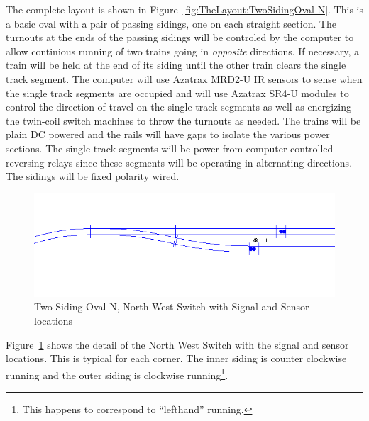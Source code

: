 The complete layout is shown in
Figure~\ref{fig:TheLayout:TwoSidingOval-N}. This is a basic oval with a
pair of passing sidings, one on each straight section. The turnouts at
the ends of the passing sidings will be controled by the computer to
allow continious running of two trains going in \textit{opposite}
directions.  If necessary, a train will be held at the end of its
siding until the other train clears the single track segment. The
computer will use Azatrax MRD2-U IR sensors to sense when the single
track segments are occupied and will use Azatrax SR4-U modules to
control the  direction of travel on the single track segments as well
as energizing the twin-coil switch machines to throw the turnouts as
needed. The trains will be plain DC powered and the rails will have gaps
to isolate the various power sections.  The single track segments will
be power from computer controlled reversing relays since these segments
will be operating in alternating directions.  The sidings will be fixed
polarity wired.

\begin{figure}[hbpt]
\begin{centering}
\includegraphics{TwoSidingOval-N-NW-Switch-sig-sensor.png}
\caption{Two Siding Oval N, North West Switch with Signal and Sensor locations}
\label{fig:TheLayout:TwoSidingOval-N-NW-Switch-sig-sensor}
\end{centering}
\end{figure}
Figure~\ref{fig:TheLayout:TwoSidingOval-N-NW-Switch-sig-sensor} shows
the detail of the North West Switch with the signal and sensor
locations. This is typical for each corner. The inner siding is counter
clockwise running and the outer siding is clockwise
running\footnote{This happens to correspond to ``lefthand'' running.}.  

